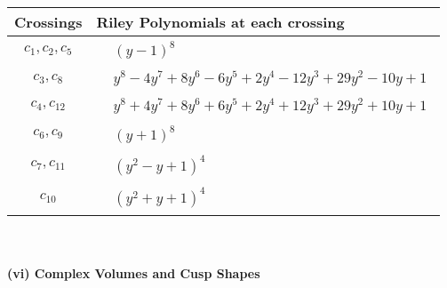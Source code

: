 \documentclass[1p]{elsarticle_modified}
\theoremstyle{definition}
\begin{document}
\begin{tabular}{m{50pt}|m{274pt}}
Crossings & \hspace{64pt}Riley Polynomials at each crossing \\
\hline $$\begin{aligned}c_{1},c_{2},c_{5}\end{aligned}$$&$\begin{aligned}
&(y-1)^8
\end{aligned}$\\
\hline $$\begin{aligned}c_{3},c_{8}\end{aligned}$$&$\begin{aligned}
&y^8-4 y^7+8 y^6-6 y^5+2 y^4-12 y^3+29 y^2-10 y+1
\end{aligned}$\\
\hline $$\begin{aligned}c_{4},c_{12}\end{aligned}$$&$\begin{aligned}
&y^8+4 y^7+8 y^6+6 y^5+2 y^4+12 y^3+29 y^2+10 y+1
\end{aligned}$\\
\hline $$\begin{aligned}c_{6},c_{9}\end{aligned}$$&$\begin{aligned}
&(y+1)^8
\end{aligned}$\\
\hline $$\begin{aligned}c_{7},c_{11}\end{aligned}$$&$\begin{aligned}
&(y^2- y+1)^4
\end{aligned}$\\
\hline $$\begin{aligned}c_{10}\end{aligned}$$&$\begin{aligned}
&(y^2+y+1)^4
\end{aligned}$\\
\hline
\end{tabular}\\~\\
\newpage\flushleft \textbf{(vi) Complex Volumes and Cusp Shapes}
\end{document}
